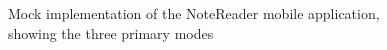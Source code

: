 \begin{figure}
\caption{Mock implementation of the NoteReader mobile application, showing the three primary modes}
\label{fig:NoteReaderMobileMock}
\end{figure}

